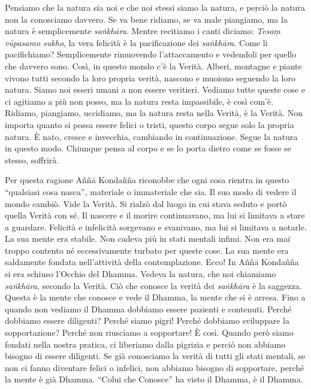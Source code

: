 Pensiamo che la natura sia noi e che noi stessi siamo la natura, e
perciò la natura non la conosciamo davvero. Se va bene ridiamo, se va
male piangiamo, ma la natura è semplicemente \emph{saṅkhāra}. Mentre
recitiamo i canti diciamo: \emph{Tesaṃ vūpasamo sukho}, la vera felicità
è la pacificazione dei \emph{saṅkhāra}. Come li pacifichiamo?
Semplicemente rimuovendo l'attaccamento e vedendoli per quello che
davvero sono. Così, in questo mondo c'è la Verità. Alberi, montagne e
piante vivono tutti secondo la loro propria verità, nascono e muoiono
seguendo la loro natura. Siamo noi esseri umani a non essere veritieri.
Vediamo tutte queste cose e ci agitiamo a più non posso, ma la natura
resta impassibile, è così com'è. Ridiamo, piangiamo, uccidiamo, ma la
natura resta nella Verità, è la Verità. Non importa quanto si possa
essere felici o tristi, questo corpo segue solo la propria natura. È
nato, cresce e invecchia, cambiando in continuazione. Segue la natura in
questo modo. Chiunque pensa al corpo e se lo porta dietro come se fosse
se stesso, soffrirà.

Per questa ragione Aññā Kondañña riconobbe che ogni cosa rientra in
questo ``qualsiasi cosa nasca'', materiale o immateriale che sia. Il suo
modo di vedere il mondo cambiò. Vide la Verità. Si rialzò dal luogo in
cui stava seduto e portò quella Verità con sé. Il nascere e il morire
continuavano, ma lui si limitava a stare a guardare. Felicità e
infelicità sorgevano e svanivano, ma lui si limitava a notarle. La sua
mente era stabile. Non cadeva più in stati mentali infimi. Non era mai
troppo contento né eccessivamente turbato per queste cose. La sua mente
era saldamente fondata nell'attività della contemplazione. Ecco! In Aññā
Kondañña si era schiuso l'Occhio del Dhamma. Vedeva la natura, che noi
chiamiamo \emph{saṅkhāra}, secondo la Verità. Ciò che conosce la verità
dei \emph{saṅkhāra} è la saggezza. Questa è la mente che conosce e vede
il Dhamma, la mente che si è arresa. Fino a quando non vediamo il Dhamma
dobbiamo essere pazienti e contenuti. Perché dobbiamo essere diligenti?
Perché siamo pigri! Perché dobbiamo sviluppare la sopportazione? Perché
non riusciamo a sopportare! È così. Quando però siamo fondati nella
nostra pratica, ci liberiamo dalla pigrizia e perciò non abbiamo bisogno
di essere diligenti. Se già conosciamo la verità di tutti gli stati
mentali, se non ci fanno diventare felici o infelici, non abbiamo
bisogno di sopportare, perché la mente è già Dhamma. ``Colui che
Conosce'' ha visto il Dhamma, è il Dhamma.


